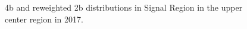 \begin{figure}[ht]
 
 
    \caption{4b and reweighted 2b distributions in Signal Region in the upper center region in 2017.}
    \label{fig:upper-center-4b-SR-2017}
\end{figure}


